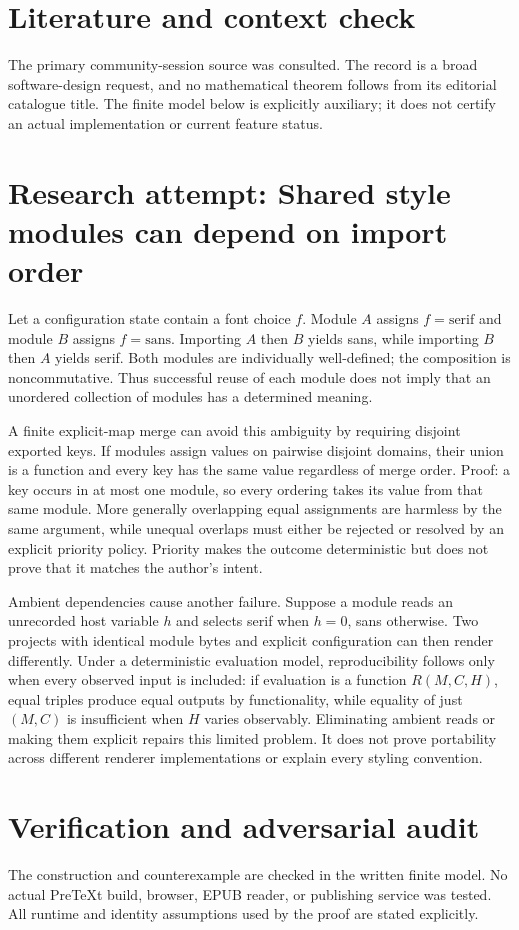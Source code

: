 \documentclass[11pt]{article}
\begin{document}
\section{Literature and context check}
The primary community-session source was consulted. The record is a broad software-design request, and no mathematical theorem follows from its editorial catalogue title. The finite model below is explicitly auxiliary; it does not certify an actual implementation or current feature status.
\section{Research attempt: Shared style modules can depend on import order}
Let a configuration state contain a font choice $f$. Module $A$ assigns $f=\text{serif}$ and module $B$ assigns $f=\text{sans}$. Importing $A$ then $B$ yields sans, while importing $B$ then $A$ yields serif. Both modules are individually well-defined; the composition is noncommutative. Thus successful reuse of each module does not imply that an unordered collection of modules has a determined meaning.

A finite explicit-map merge can avoid this ambiguity by requiring disjoint exported keys. If modules assign values on pairwise disjoint domains, their union is a function and every key has the same value regardless of merge order. Proof: a key occurs in at most one module, so every ordering takes its value from that same module. More generally overlapping equal assignments are harmless by the same argument, while unequal overlaps must either be rejected or resolved by an explicit priority policy. Priority makes the outcome deterministic but does not prove that it matches the author's intent.

Ambient dependencies cause another failure. Suppose a module reads an unrecorded host variable $h$ and selects serif when $h=0$, sans otherwise. Two projects with identical module bytes and explicit configuration can then render differently. Under a deterministic evaluation model, reproducibility follows only when every observed input is included: if evaluation is a function $R(M,C,H)$, equal triples produce equal outputs by functionality, while equality of just $(M,C)$ is insufficient when $H$ varies observably. Eliminating ambient reads or making them explicit repairs this limited problem. It does not prove portability across different renderer implementations or explain every styling convention.
\section{Verification and adversarial audit}
The construction and counterexample are checked in the written finite model. No actual PreTeXt build, browser, EPUB reader, or publishing service was tested. All runtime and identity assumptions used by the proof are stated explicitly.
\end{document}
